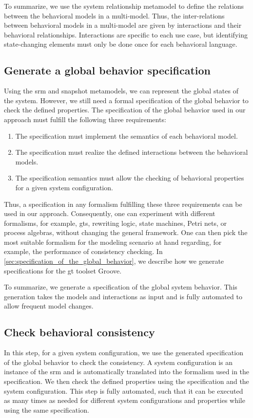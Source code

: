 \documentclass{jot}
\begin{document}
To summarize, we use the system relationship metamodel to define the relations between the behavioral models in a multi-model.
Thus, the inter-relations between behavioral models in a multi-model are given by interactions and their behavioral relationships.
Interactions are specific to each use case, but identifying state-changing elements must only be done once for each behavioral language.

\subsection{Generate a global behavior specification}
Using the \gls*{srm} and snapshot metamodels, we can represent the global states of the system.
However, we still need a formal specification of the global behavior to check the defined properties.
The specification of the global behavior used in our approach must fulfill the following three requirements:
\begin{enumerate}
    \item The specification must implement the semantics of each behavioral model.
    \item The specification must realize the defined interactions between the behavioral models.
    \item The specification semantics must allow the checking of behavioral properties for a given system configuration.
\end{enumerate}
Thus, a specification in any formalism fulfilling these three requirements can be used in our approach.
Consequently, one can experiment with different formalisms, for example, \glspl*{gt}, rewriting logic, state machines, Petri nets, or process algebras, without changing the general framework.
One can then pick the most suitable formalism for the modeling scenario at hand regarding, for example, the performance of consistency checking.
In \cref{sec:specification_of_the_global_behavior}, we describe how we generate specifications for the \gls*{gt} toolset Groove.

To summarize, we generate a specification of the global system behavior.
This generation takes the models and interactions as input and is fully automated to allow frequent model changes.


\subsection{Check behavioral consistency}
In this step, for a given system configuration, we use the generated specification of the global behavior to check the consistency.
A system configuration is an instance of the \gls*{srm} and is automatically translated into the formalism used in the specification.
We then check the defined properties using the specification and the system configuration.
This step is fully automated, such that it can be executed as many times as needed for different system configurations and properties while using the same specification.
\end{document}
